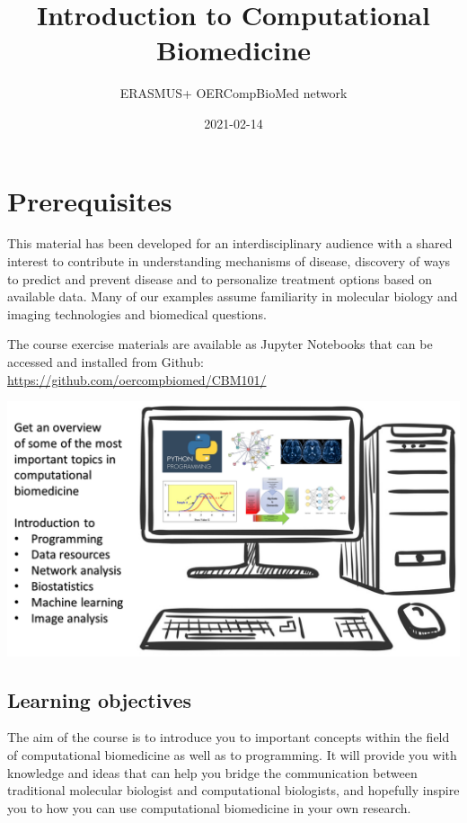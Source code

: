 \documentclass[
]{book}
\title{Introduction to Computational Biomedicine}
\author{ERASMUS+ OERCompBioMed network}
\date{2021-02-14}
\begin{document}
\maketitle

{
\setcounter{tocdepth}{1}
\tableofcontents
}
\hypertarget{prerequisites}{%
\chapter{Prerequisites}\label{prerequisites}}

This material has been developed for an interdisciplinary audience with a shared interest to contribute in understanding mechanisms of disease, discovery of ways to predict and prevent disease and to personalize treatment options based on available data. Many of our examples assume familiarity in molecular biology and imaging technologies and biomedical questions.

The course exercise materials are available as Jupyter Notebooks that can be accessed and installed from Github: \url{https://github.com/oercompbiomed/CBM101/}

\includegraphics{assets/overview.png}

\hypertarget{learning-objectives}{%
\section{Learning objectives}\label{learning-objectives}}

The aim of the course is to introduce you to important concepts within the field of computational biomedicine as well as to programming. It will provide you with knowledge and ideas that can help you bridge the communication between traditional molecular biologist and computational biologists, and hopefully inspire you to how you can use computational biomedicine in your own research.
\end{document}
